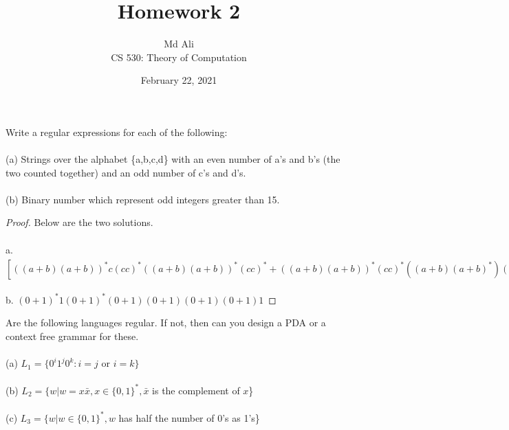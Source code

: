 \documentclass[12pt]{article}
\newenvironment{exercise}[2][Exercise]{\begin{trivlist}
\item[\hskip \labelsep {\bfseries #1}\hskip \labelsep {\bfseries #2.}]}{\end{trivlist}}
\begin{document}
 
\title{Homework 2}
\author{Md Ali \\ 
CS 530: Theory of Computation} 
\date{February 22, 2021}

\maketitle
 
\begin{exercise}{1}
Write a regular expressions for each of the following: \\ \\  
(a) Strings over the alphabet \{a,b,c,d\} with an even number of a's and b's (the two counted together) and an odd number of c's and d's. \\ \\ 
(b) Binary number which represent odd integers greater than 15. 
\end{exercise} 

\begin{proof}
Below are the two solutions. \\ \\ 
a. $[((a+b)(a+b))^{*}c(cc)^{*}((a+b)(a+b))^{*}(cc)^{*} + ((a+b)(a+b))^{*}(cc)^{*}((a+b)(a+b)^{*})(cc)^{*}((a+b)(a+b)^{*})(cc)^{*}((a+b)(a+b)^{*})c(cc^{*}) + (((a+b)(a+b))^{*}d(dd)^{*}((a+b)(a+b))^{*}(dd)^{*} + ((a+b)(a+b))^{*}(dd)^{*}((a+b)(a+b)^{*})(dd)^{*}((a+b)(a+b)^{*})(dd)^{*}((a+b)(a+b)^{*})d(dd^{*})]^{*}$ \\ \\ 
b. $(0+1)^{*}1(0+1)^{*}(0+1)(0+1)(0+1)(0+1)1$

\end{proof} 

\begin{exercise}{2}
Are the following languages regular. If not, then can you design a PDA or a context free grammar for these. \\ \\ 
(a) $L_{1} = \{0^{i}1^{j}0^{k} : i = j \text{ or } i = k\}$ \\ \\ 
(b) $L_{2} = \{ w | w = x \bar{x}, x \in \{0,1\}^{*}, \bar{x}$ is the complement of $x$\} \\ \\ 
(c) $L_{3} = \{ w | w \in \{ 0,1\}^{*}, w$ has half the number of 0's as 1's\}
\end{exercise}
 
\end{document}
